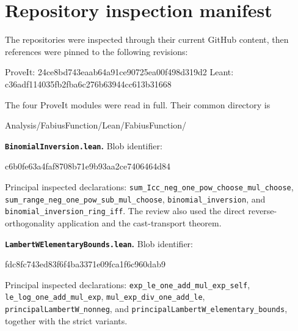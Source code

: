 \documentclass[11pt,a4paper]{article}
\newcommand{\codeid}[1]{\nolinkurl{#1}}
\begin{document}
\section{Repository inspection manifest}
\label{app:sources}

The repositories were inspected through their current GitHub content, then references were pinned to the following revisions:
\par\noindent\begin{minipage}{\linewidth}
\begin{rawcode}
ProveIt: 24ce8bd743eaab64a91ce90725ea00f498d319d2
Leant:   c36adf114035fb2fba6c276b63944cc613b31668
\end{rawcode}
\end{minipage}\par

The four ProveIt modules were read in full. Their common directory is
\par\noindent\begin{minipage}{\linewidth}
\begin{rawcode}
Analysis/FabiusFunction/Lean/FabiusFunction/
\end{rawcode}
\end{minipage}\par

\textbf{\codeid{BinomialInversion.lean}.} Blob identifier:
\par\noindent\begin{minipage}{\linewidth}
\begin{rawcode}
c6b0fe63a4faf8708b71e9b93aa2ce7406464d84
\end{rawcode}
\end{minipage}\par
Principal inspected declarations: \codeid{sum_Icc_neg_one_pow_choose_mul_choose}, \codeid{sum_range_neg_one_pow_sub_mul_choose}, \codeid{binomial_inversion}, and \codeid{binomial_inversion_ring_iff}. The review also used the direct reverse-orthogonality application and the cast-transport theorem.

\textbf{\codeid{LambertWElementaryBounds.lean}.} Blob identifier:
\par\noindent\begin{minipage}{\linewidth}
\begin{rawcode}
fdc8fc743ed83f6f4ba3371e09fca1f6c960dab9
\end{rawcode}
\end{minipage}\par
Principal inspected declarations: \codeid{exp_le_one_add_mul_exp_self}, \codeid{le_log_one_add_mul_exp}, \codeid{mul_exp_div_one_add_le}, \codeid{principalLambertW_nonneg}, and \codeid{principalLambertW_elementary_bounds}, together with the strict variants.
\end{document}
